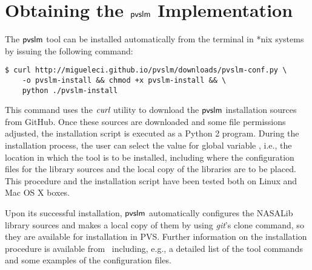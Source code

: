 \section{Obtaining the $\textsf{pvslm}$ Implementation}
\label{sec.install}

The $\textsf{pvslm}$ tool can be installed automatically from the terminal in
*nix systems by issuing the following command:
%
{\small
\begin{lstlisting}
$ curl http://migueleci.github.io/pvslm/downloads/pvslm-conf.py \
    -o pvslm-install && chmod +x pvslm-install && \
    python ./pvslm-install
\end{lstlisting}
}
%
This command uses the $\textit{curl}$ utility to download the $\textsf{pvslm}$
installation sources from GitHub. Once these sources are downloaded
and some file permissions adjusted, the installation script is
executed as a Python 2 program. During the installation process, the
user can select the value for global variable \cde{PVS\_PATH}, i.e.,
the location in which the tool is to be installed, including where the
configuration files for the library sources and the local copy of the
libraries are to be placed. This procedure and the installation script
have been tested both on Linux and Mac OS X boxes.

Upon its successful installation, $\textsf{pvslm}$ automatically configures
the NASALib library sources and makes a local copy of them by using
{\em git}'s clone command, so they are available for installation in
PVS.  Further information on the installation procedure is available
from~\cite{pvslm} including, e.g., a detailed list of the tool
commands and some examples of the configuration files.
